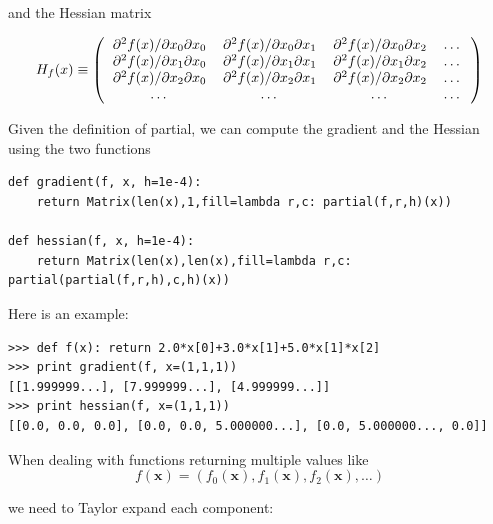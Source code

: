\documentclass[justified,sixbynine]{tufte-book}
\def\ft{\small\tt}
\theoremstyle{plain}%
\theoremstyle{definition}
\theoremstyle{remark}
\begin{document}
\begin{fullwidth}
and the Hessian matrix

\begin{equation}
H_f(x) \equiv \left(
\begin{tabular}{cccc}
$\partial^2 f(x)/\partial x_0\partial x_0$ &
$\partial^2 f(x)/\partial x_0\partial x_1$ &
$\partial^2 f(x)/\partial x_0\partial x_2$ &
\dots \\
$\partial^2 f(x)/\partial x_1\partial x_0$ &
$\partial^2 f(x)/\partial x_1\partial x_1$ &
$\partial^2 f(x)/\partial x_1\partial x_2$ &
\dots \\
$\partial^2 f(x)/\partial x_2\partial x_0$ &
$\partial^2 f(x)/\partial x_2\partial x_1$ &
$\partial^2 f(x)/\partial x_2\partial x_2$ &
\dots \\
\dots & \dots & \dots &\dots 
\end{tabular}
\right)
\end{equation}

Given the definition of partial, we can compute the gradient and the Hessian using the two functions

\begin{lstlisting}[caption={in file: {\ft nlib.py}}]
def gradient(f, x, h=1e-4):
    return Matrix(len(x),1,fill=lambda r,c: partial(f,r,h)(x))

def hessian(f, x, h=1e-4):
    return Matrix(len(x),len(x),fill=lambda r,c: partial(partial(f,r,h),c,h)(x))
\end{lstlisting}

Here is an example:

\begin{lstlisting}[caption={in file: {\ft nlib.py}}]
>>> def f(x): return 2.0*x[0]+3.0*x[1]+5.0*x[1]*x[2]
>>> print gradient(f, x=(1,1,1))
[[1.999999...], [7.999999...], [4.999999...]]
>>> print hessian(f, x=(1,1,1))
[[0.0, 0.0, 0.0], [0.0, 0.0, 5.000000...], [0.0, 5.000000..., 0.0]]
\end{lstlisting}

When dealing with functions returning multiple values like
\begin{equation}
f(\mathbf{x}) = (f_0(\mathbf{x}), f_1(\mathbf{x}), f_2(\mathbf{x}), \dots)
\end{equation}

we need to Taylor expand each component:


\end{fullwidth}
\end{document}
